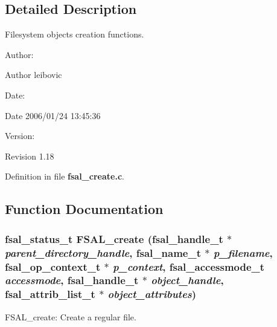 \subsection{Detailed Description}
Filesystem objects creation functions. 

\begin{Desc}
\item[Author:]\begin{Desc}
\item[Author]leibovic \end{Desc}
\end{Desc}
\begin{Desc}
\item[Date:]\begin{Desc}
\item[Date]2006/01/24 13:45:36 \end{Desc}
\end{Desc}
\begin{Desc}
\item[Version:]\begin{Desc}
\item[Revision]1.18 \end{Desc}
\end{Desc}


Definition in file {\bf fsal\_\-create.c}.

\subsection{Function Documentation}
\subsubsection{\setlength{\rightskip}{0pt plus 5cm}fsal\_\-status\_\-t FSAL\_\-create (fsal\_\-handle\_\-t $\ast$ {\em parent\_\-directory\_\-handle}, fsal\_\-name\_\-t $\ast$ {\em p\_\-filename}, fsal\_\-op\_\-context\_\-t $\ast$ {\em p\_\-context}, fsal\_\-accessmode\_\-t {\em accessmode}, fsal\_\-handle\_\-t $\ast$ {\em object\_\-handle}, fsal\_\-attrib\_\-list\_\-t $\ast$ {\em object\_\-attributes})}\label{fsal__create_8c_a0}


FSAL\_\-create: Create a regular file.

